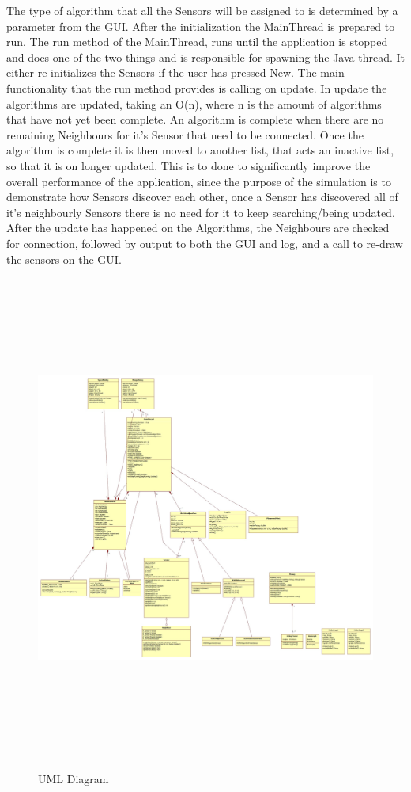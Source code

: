 The type of algorithm that all the Sensors will be assigned to is determined by a 
parameter from the GUI. After the initialization the MainThread is prepared to 
run.  The run method of the MainThread, runs until the application is stopped and 
does one of the two things and is responsible for spawning the Java thread. It 
either re-initializes the Sensors if the user has pressed New. The main 
functionality that the run method provides is calling on update. In update the 
algorithms are updated, taking an O(n), where n is the amount of algorithms that 
have not yet been complete. An algorithm is complete when there are no remaining 
Neighbours for it's Sensor that need to be connected. Once the algorithm is 
complete it is then moved to another list, that acts an inactive list, so that it 
is on longer updated. This is to done to significantly improve the overall 
performance of the application, since the purpose of the simulation is to 
demonstrate how Sensors discover each other, once a Sensor has discovered all of 
it's neighbourly Sensors there is no need for it to keep searching/being updated. 
After the update has happened on the Algorithms, the Neighbours are checked for 
connection, followed by output to both the GUI and log, and a call to re-draw the 
sensors on the GUI. 

\begin{figure}
\caption{UML Diagram}
\includegraphics[height = 16cm]{pics/Main.jpg}\\[0.5cm]    
\end{figure}

